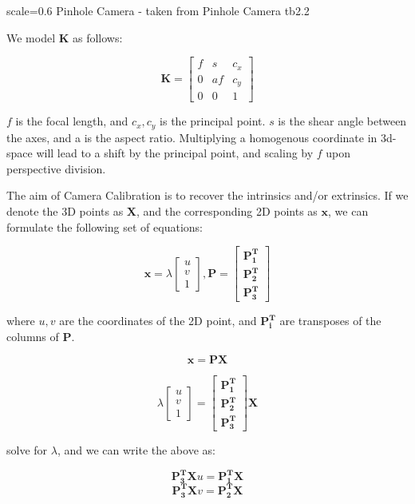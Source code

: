 {scale=0.6}%
{Pinhole Camera - taken from \cite{schoenberger2018}}%
{Pinhole Camera}%
{tb2.2}

We model \textbf{K} as follows:

\[\mathbf{K} = \begin{bmatrix}
f & s & c_x\\
0 & af & c_y\\
0 & 0 & 1
\end{bmatrix}\]

$f$ is the focal length, and $c_x, c_y$ is the principal point. $s$ is the shear angle between the axes, and a is the aspect ratio. Multiplying a homogenous coordinate in 3d-space will lead to a shift by the principal point, and scaling by $f$ upon perspective division. 

The aim of Camera Calibration is to recover the intrinsics and/or extrinsics. If we denote the 3D points as $\mathbf{X}$, and the corresponding 2D points as $\mathbf{x}$, we can formulate the following set of equations:

\[\mathbf{x}=\lambda\begin{bmatrix}
u\\
v\\
1\end{bmatrix}, \mathbf{P} = \begin{bmatrix}
\mathbf{P_1^T}\\
\mathbf{P_2^T}\\
\mathbf{P_3^T}\end{bmatrix} \]

where $u, v$ are the coordinates of the 2D point, and $\mathbf{P_i^T}$ are transposes of the columns of $\mathbf{P}$. 

\[\mathbf{x} = \mathbf{PX}\]

\[\lambda\begin{bmatrix}
u\\
v\\
1\end{bmatrix} = \begin{bmatrix}
\mathbf{P_1^T}\\
\mathbf{P_2^T}\\
\mathbf{P_3^T}\end{bmatrix}\mathbf{X}\]

solve for $\lambda$, and we can write the above as:

\[\mathbf{P_3^TX}u = \mathbf{P_1^TX}\]
\[\mathbf{P_3^TX}v = \mathbf{P_2^TX}\]

